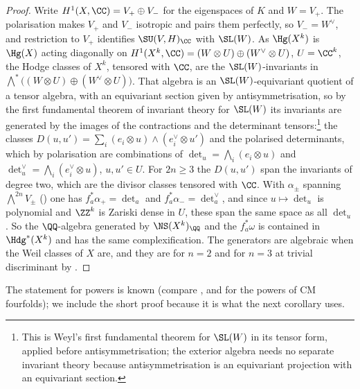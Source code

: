 \begin{proof}
Write $H^{1}(X,\CC)=V_{+}\oplus V_{-}$ for the eigenspaces of $K$ and
$W=V_{+}$. The polarisation makes $V_{+}$ and $V_{-}$ isotropic and pairs them
perfectly, so $V_{-}=W^{\vee}$, and restriction to $V_{+}$ identifies
$\SU(V,H)_{\CC}$ with $\SL(W)$. As $\Hg(X^{k})$ is $\Hg(X)$ acting diagonally
on $H^{1}(X^{k},\CC)=(W\otimes U)\oplus(W^{\vee}\otimes U)$, $U=\CC^{k}$, the
Hodge classes of $X^{k}$, tensored with $\CC$, are the $\SL(W)$-invariants in
$\bigwedge^{*}\bigl((W\otimes U)\oplus(W^{\vee}\otimes U)\bigr)$. That algebra
is an $\SL(W)$-equivariant quotient of a tensor algebra, with an equivariant
section given by antisymmetrisation, so by the first fundamental theorem of
invariant theory for $\SL(W)$ its invariants are generated by the images of
the contractions and the determinant
tensors:\footnote{This is Weyl's first fundamental theorem for $\SL(W)$ in
its tensor form, applied before antisymmetrisation; the exterior algebra
needs no separate invariant theory because antisymmetrisation is an
equivariant projection with an equivariant section.} the classes
$D(u,u')=\sum_{i}(e_{i}\otimes u)\wedge(e_{i}^{\vee}\otimes u')$ and the
polarised determinants, which by polarisation are combinations of
$\det_{u}=\bigwedge_{i}(e_{i}\otimes u)$ and
$\det^{\vee}_{u}=\bigwedge_{i}(e_{i}^{\vee}\otimes u)$, $u,u'\in U$. For
$2n\ge3$ the $D(u,u')$ span the invariants of degree two, which are the
divisor classes tensored with $\CC$. With $\alpha_{\pm}$ spanning
$\bigwedge^{2n}V_{\pm}$ () one has
$f_{a}^{*}\alpha_{+}=\det_{a}$ and $f_{a}^{*}\alpha_{-}=\det^{\vee}_{a}$, and
since $u\mapsto\det_{u}$ is polynomial and $\ZZ^{k}$ is Zariski dense in
$U$, these span the same space as all $\det_{u}$. So the $\QQ$-algebra
generated by $\NS(X^{k})_{\QQ}$ and the $f_{a}^{*}\omega$ is contained in
$\Hdg^{*}(X^{k})$ and has the same complexification. The generators are
algebraic when the Weil classes of $X$ are, and they are for $n=2$ and for
$n=3$ at trivial discriminant by \cite{Mar25a}.
\end{proof}

The statement for powers is known (compare \cite{Mil22}, and \cite{Li26} for
the powers of CM fourfolds); we include the short proof because it is what
the next corollary uses.

